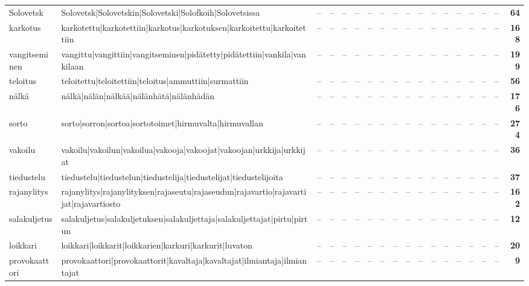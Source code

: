 \documentclass[10pt,a4paper]{article}
\begin{document}
\begin{center}
\begin{longtable}{@{}lp{52mm}rrrrrrrrrrrrrrrr@{}}
Solovetsk & {\ttfamily Solovetsk|Solovetskin|Solovetski|Solofkoih|Solovetsissa} & -- & -- & -- & -- & -- & -- & -- & -- & -- & -- & -- & -- & -- & -- & -- & \textbf{64} \\
karkotus & {\ttfamily karkotettu|karkotettiin|karkotus|karkotuksen|karkoitettu|karkoitettiin} & -- & -- & -- & -- & -- & -- & -- & -- & -- & -- & -- & -- & -- & -- & -- & \textbf{168} \\
vangitseminen & {\ttfamily vangittu|vangittiin|vangitseminen|pidätetty|pidätettiin|vankila|vankilaan} & -- & -- & -- & -- & -- & -- & -- & -- & -- & -- & -- & -- & -- & -- & -- & \textbf{199} \\
teloitus & {\ttfamily teloitettu|teloitettiin|teloitus|ammuttiin|surmattiin} & -- & -- & -- & -- & -- & -- & -- & -- & -- & -- & -- & -- & -- & -- & -- & \textbf{56} \\
nälkä & {\ttfamily nälkä|nälän|nälkää|nälänhätä|nälänhädän} & -- & -- & -- & -- & -- & -- & -- & -- & -- & -- & -- & -- & -- & -- & -- & \textbf{176} \\
sorto & {\ttfamily sorto|sorron|sortoa|sortotoimet|hirmuvalta|hirmuvallan} & -- & -- & -- & -- & -- & -- & -- & -- & -- & -- & -- & -- & -- & -- & -- & \textbf{274} \\
vakoilu & {\ttfamily vakoilu|vakoilun|vakoilua|vakooja|vakoojat|vakoojan|urkkija|urkkijat} & -- & -- & -- & -- & -- & -- & -- & -- & -- & -- & -- & -- & -- & -- & -- & \textbf{36} \\
tiedustelu & {\ttfamily tiedustelu|tiedustelun|tiedustelija|tiedustelijat|tiedustelijoita} & -- & -- & -- & -- & -- & -- & -- & -- & -- & -- & -- & -- & -- & -- & -- & \textbf{37} \\
rajanylitys & {\ttfamily rajanylitys|rajanylityksen|rajaseutu|rajaseudun|rajavartio|rajavartijat|rajavartiosto} & -- & -- & -- & -- & -- & -- & -- & -- & -- & -- & -- & -- & -- & -- & -- & \textbf{162} \\
salakuljetus & {\ttfamily salakuljetus|salakuljetuksen|salakuljettaja|salakuljettajat|pirtu|pirtun} & -- & -- & -- & -- & -- & -- & -- & -- & -- & -- & -- & -- & -- & -- & -- & \textbf{12} \\
loikkari & {\ttfamily loikkari|loikkarit|loikkarien|karkuri|karkurit|luvaton} & -- & -- & -- & -- & -- & -- & -- & -- & -- & -- & -- & -- & -- & -- & -- & \textbf{20} \\
provokaattori & {\ttfamily provokaattori|provokaattorit|kavaltaja|kavaltajat|ilmiantaja|ilmiantajat} & -- & -- & -- & -- & -- & -- & -- & -- & -- & -- & -- & -- & -- & -- & -- & \textbf{9} \\

\end{longtable}
\end{center}
\end{document}
